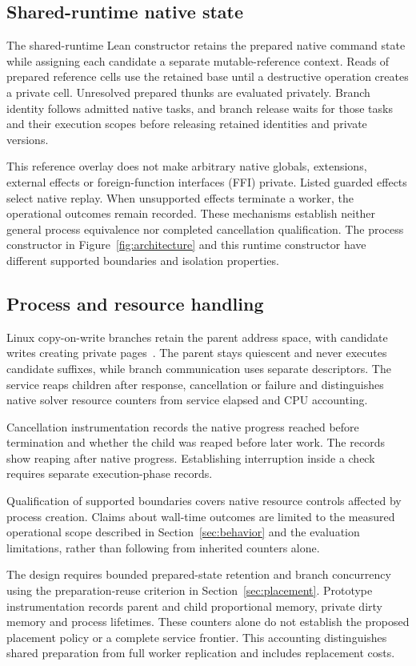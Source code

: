 \documentclass[10pt,twocolumn]{article}
\begin{document}
\subsection{Shared-runtime native state}
The shared-runtime Lean constructor retains the prepared native command state
while assigning each candidate a separate mutable-reference context. Reads of
prepared reference cells use the retained base until a destructive operation
creates a private cell. Unresolved prepared thunks are evaluated privately.
Branch identity follows admitted native tasks, and branch release waits for
those tasks and their execution scopes before releasing retained identities and
private versions.

This reference overlay does not make arbitrary native globals, extensions,
external effects or foreign-function interfaces (FFI) private. Listed guarded
effects select native replay. When unsupported effects terminate a worker, the operational outcomes remain
recorded. These mechanisms establish neither general process
equivalence nor completed cancellation qualification. The process constructor
in Figure~\ref{fig:architecture} and this runtime constructor have different
supported boundaries and isolation properties.

\subsection{Process and resource handling}
Linux copy-on-write branches retain the parent address space, with candidate writes creating private pages~\cite{fork}. The parent stays quiescent and never executes candidate suffixes, while branch communication uses separate descriptors. The service reaps children after response, cancellation or failure and distinguishes native solver resource counters from service elapsed and CPU accounting.

Cancellation instrumentation records the native progress reached before termination and whether the child was reaped before later work. The records show reaping after native progress. Establishing interruption inside a check requires separate execution-phase records.

Qualification of supported boundaries covers native resource controls affected by process creation. Claims about wall-time outcomes are limited to the measured operational scope described in Section~\ref{sec:behavior} and the evaluation limitations, rather than following from inherited counters alone.

The design requires bounded prepared-state retention and branch concurrency using the preparation-reuse criterion in Section~\ref{sec:placement}. Prototype instrumentation records parent and child proportional memory, private dirty memory and process lifetimes. These counters alone do not establish the proposed placement policy or a complete service frontier. This accounting distinguishes shared preparation from full worker replication and includes replacement costs.
\end{document}
